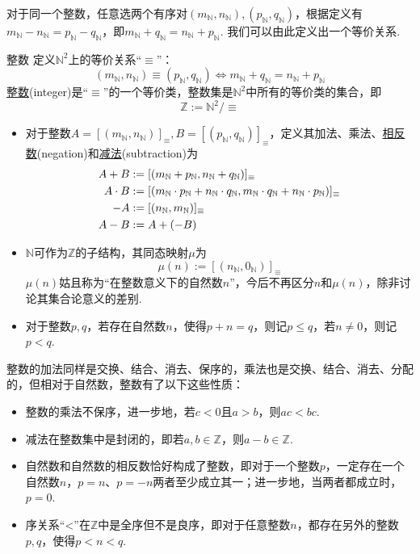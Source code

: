 对于同一个整数，任意选两个有序对\((m_{\mathbb{N}},n_{\mathbb{N}}),(p_{\mathbb{N}},q_{\mathbb{N}})\)，根据定义有\(m_{\mathbb{N}}-n_{\mathbb{N}} = p_{\mathbb{N}}-q_{\mathbb{N}}\)，即\(m_{\mathbb{N}}+q_{\mathbb{N}}=n_{\mathbb{N}}+p_{\mathbb{N}}\). 我们可以由此定义出一个等价关系.

\begin{definition}{整数}
    定义\(\mathbb{N}^2\)上的等价关系“\(\equiv\)”：
    \[(m_{\mathbb{N}},n_{\mathbb{N}}) \equiv (p_{\mathbb{N}},q_{\mathbb{N}}) \Leftrightarrow m_{\mathbb{N}}+q_{\mathbb{N}}=n_{\mathbb{N}}+p_{\mathbb{N}}\]
    \underline{整数}(integer)是“\(\equiv\)”的一个等价类，整数集是\(\mathbb{N}^2\)中所有的等价类的集合，即
    \[\mathbb{Z} := \mathbb{N}^2/\equiv\]
    \begin{itemize}
        \item  对于整数\(A = [(m_{\mathbb{N}},n_{\mathbb{N}})]_{\equiv}, B = [(p_{\mathbb{N}},q_{\mathbb{N}})]_{\equiv}\)，定义其加法、乘法、\underline{相反数}(negation)和\underline{减法}(subtraction)为
        \[
            \begin{aligned}
                \relax A+B &:= [(m_{\mathbb{N}}+p_{\mathbb{N}},n_{\mathbb{N}}+q_{\mathbb{N}})]_{\equiv}\\
                A \cdot B &:= [(m_{\mathbb{N}} \cdot p_{\mathbb{N}} + n_{\mathbb{N}} \cdot q_{\mathbb{N}}, m_{\mathbb{N}} \cdot q_{\mathbb{N}} + n_{\mathbb{N}} \cdot p_{\mathbb{N}})]_\equiv \\
                -A &:= [(n_{\mathbb{N}},m_{\mathbb{N}})]_{\equiv} \\
                A-B &:= A + (-B)
            \end{aligned}
        \]
        \item  \(\mathbb{N}\)可作为\(\mathbb{Z}\)的子结构，其同态映射\(\mu\)为
        \[\mu(n) := [(n_{\mathbb{N}},0_{\mathbb{N}})]_{\equiv}\]
        \(\mu(n)\)姑且称为“在整数意义下的自然数\(n\)”，今后不再区分\(n\)和\(\mu(n)\)，除非讨论其集合论意义的差别.
        \item  对于整数\(p,q\)，若存在自然数\(n\)，使得\(p+n=q\)，则记\(p\leq q\)，若\(n \neq 0\)，则记\(p < q\).
    \end{itemize}
\end{definition}

整数的加法同样是交换、结合、消去、保序的，乘法也是交换、结合、消去、分配的，但相对于自然数，整数有了以下这些性质：
\begin{itemize}
    \item 整数的乘法不保序，进一步地，若\(c<0\)且\(a>b\)，则\(ac<bc\).
    \item 减法在整数集中是封闭的，即若\(a,b \in \mathbb{Z}\)，则\(a-b \in \mathbb{Z}\).
    \item 自然数和自然数的相反数恰好构成了整数，即对于一个整数\(p\)，一定存在一个自然数\(n\)，\(p=n\)、\(p=-n\)两者至少成立其一；进一步地，当两者都成立时，\(p=0\).
    \item 序关系“<”在\(\mathbb{Z}\)中是全序但不是良序，即对于任意整数\(n\)，都存在另外的整数\(p,q\)，使得\(p<n<q\).
\end{itemize}

